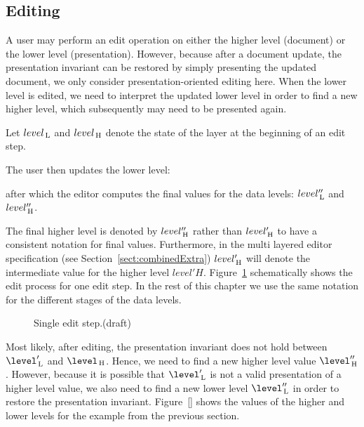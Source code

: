 

\subsection{Editing}\label{sect:single_Editing}

A user may perform an edit operation on either the higher level (document) or the lower level (presentation). However, because after a document update, the presentation invariant can be restored by simply presenting the updated document, we only consider presentation-oriented editing here. When the lower level is edited, we need to interpret the updated lower level in order to find a new higher level, which subsequently may need to be presented again.


Let $level_{\, \mathrm L}$ and $level_{\, \mathrm H}$ denote the state of the layer at the beginning of an edit step. 


The user then updates the lower level:


after which the editor computes the final values for the data levels: $level''_{\, \mathrm L}$ and $level''_{\, \mathrm H}$.

The final higher level is denoted by $level''_{\, \mathrm H}$ rather than $level'_{\, \mathrm H}$ to have a consistent notation for final values. Furthermore, in the multi layered editor specification (see Section~\ref{sect:combinedExtra}) $level'_{\, \mathrm H}$ will denote the intermediate value for the higher level $level'H$. Figure~\ref{singleLayerEdit} schematically shows the edit process for one edit step. In the rest of this chapter we use the same notation for the different stages of the data levels.

\begin{figure}
\caption{Single edit step.(draft)} \label{singleLayerEdit}
\end{figure}


Most likely, after editing, the presentation invariant does not hold between $\level'\L$ and $\level\H$. Hence, we need to find a new higher level value $\level''\H$. However, because it is possible that $\level'\L$ is not a valid presentation of a higher level value, we also need to find a new lower level $\level''\L$ in order to restore the presentation invariant. Figure~\ref{} shows the values of the higher and lower levels for the example from the previous section.

